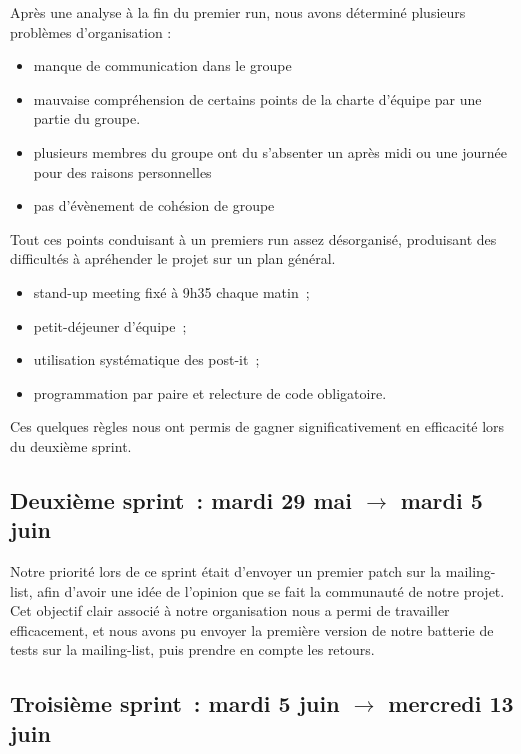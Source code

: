 \documentclass[11pt]{article}
\begin{document}
Après une analyse à la fin du premier run, nous avons déterminé plusieurs problèmes d'organisation : 

\begin{itemize}
\item manque de communication dans le groupe
\item mauvaise compréhension de certains points de la charte d'équipe par une partie du groupe.
\item plusieurs membres du groupe ont du s'absenter un après midi ou une journée pour des raisons personnelles
\item pas d'évènement de cohésion de groupe
\end{itemize}

Tout ces points conduisant à un premiers run assez désorganisé, produisant des difficultés à apréhender le projet sur un plan général.

\begin{itemize}
\item stand-up meeting fixé à 9h35 chaque matin~;
\item petit-déjeuner d'équipe~;
\item utilisation systématique des post-it~;
\item programmation par paire et relecture de code obligatoire.
\end{itemize}

  Ces quelques règles nous ont permis de gagner significativement en
  efficacité lors du deuxième sprint.

\subsection{Deuxième sprint~: mardi 29 mai $\rightarrow$ mardi 5 juin}

Notre priorité lors de ce sprint était d'envoyer un premier patch sur
la mailing-list, afin d'avoir une idée de l'opinion que se fait la
communauté de notre projet. Cet objectif clair associé à notre
organisation nous a permi de travailler efficacement, et nous avons pu
envoyer la première version de notre batterie de tests sur la
mailing-list, puis prendre en compte les retours.

\subsection{Troisième sprint~: mardi 5 juin $\rightarrow$ mercredi 13 juin}
\end{document}
